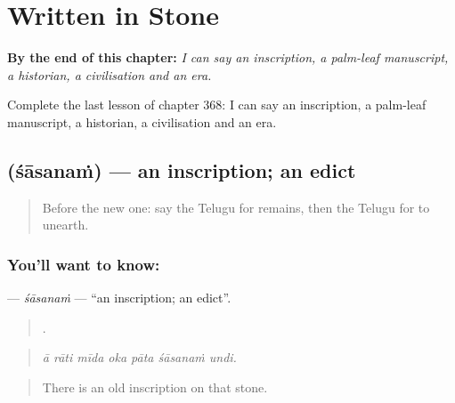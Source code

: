 
\chapter{Written in Stone}
\label{ch:te-written-in-stone}

\begin{chapteropening}
\textbf{By the end of this chapter:} \emph{I can say an inscription, a palm-leaf manuscript, a historian, a civilisation and an era.}

Complete the last lesson of chapter 368: I can say an inscription, a palm-leaf manuscript, a historian, a civilisation and an era.
\end{chapteropening}

\section[\texorpdfstring{\te{శాసనం} (śāsanaṁ)}{శాసనం (śāsanaṁ)}]{ (śāsanaṁ) — an inscription; an edict}

\label{lesson:TE-C368-sasanam}



\begin{quote}
Before the new one: say the Telugu for remains, then the Telugu for to unearth.
\end{quote}

\subsection*{You'll want to know: }
\textbf{} — \emph{śāsanaṁ} — \textquotedblleft{}an inscription; an edict\textquotedblright{}.

\begin{quote}
      .
\end{quote}

\begin{quote}
\emph{ā rāti mīda oka pāta śāsanaṁ undi.}
\end{quote}

\begin{quote}
There is an old inscription on that stone.
\end{quote}

